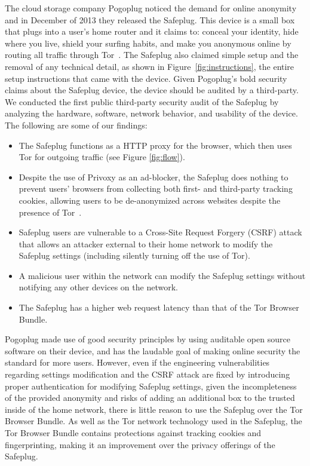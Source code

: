 \documentclass[conference]{IEEEtran}
\begin{document}
The cloud storage company Pogoplug noticed the demand for online anonymity and in December of 2013 they released the Safeplug.  This device is a small box that plugs into a user's home router and it claims to: conceal your identity, hide where you live, shield your surfing habits, and make you anonymous online by routing all traffic through Tor~\cite{safeplug}.  The Safeplug also claimed simple setup and the removal of any technical detail, as shown in Figure~\ref{fig:instructions}, the entire setup instructions that came with the device.  Given Pogoplug's bold security claims about the Safeplug device, the device should be audited by a third-party.  We conducted the first public third-party security audit of the Safeplug by analyzing the hardware, software, network behavior, and usability of the device.  The following are some of our findings:

\begin{itemize}
\item The Safeplug functions as a HTTP proxy for the browser, which then uses Tor for outgoing traffic (see Figure \ref{fig:flow}).
\item Despite the use of Privoxy as an ad-blocker, the Safeplug does nothing to prevent users' browsers from collecting both first- and third-party tracking cookies, allowing users to be de-anonymized across websites despite the presence of Tor~\cite{arvindpets}.
\item Safeplug users are vulnerable to a Cross-Site Request Forgery (CSRF) attack that allows an attacker external to their home network to modify the Safeplug settings (including silently turning off the use of Tor).
\item A malicious user within the network can modify the Safeplug settings without notifying any other devices on the network.
\item The Safeplug has a higher web request latency than that of the Tor Browser Bundle.
\end{itemize} 

Pogoplug made use of good security principles by using auditable open source software on their device, and has the laudable goal of making online security the standard for more users.  However, even if the engineering vulnerabilities regarding settings modification and the CSRF attack are fixed by introducing proper authentication for modifying Safeplug settings, given the incompleteness of the provided anonymity and risks of adding an additional box to the trusted inside of the home network, there is little reason to use the Safeplug over the Tor Browser Bundle.  As well as the Tor network technology used in the Safeplug, the Tor Browser Bundle contains protections against tracking cookies and fingerprinting, making it an improvement over the privacy offerings of the Safeplug.
\end{document}
